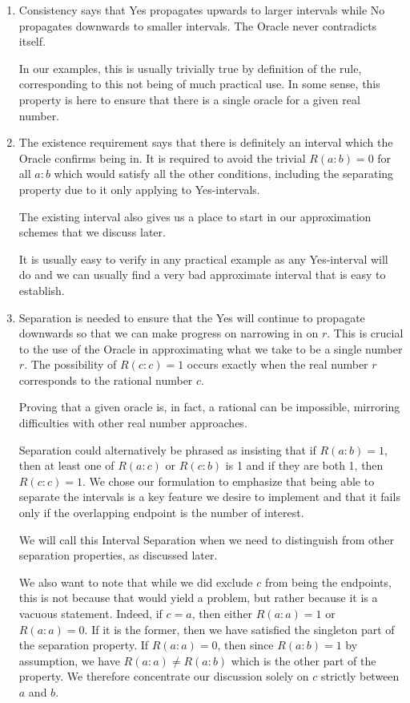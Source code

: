 \documentclass[12pt]{article}
\begin{document}
\begin{enumerate}

    \item Consistency says that Yes propagates upwards to larger intervals while No propagates downwards to smaller intervals. The Oracle never contradicts itself. 
    
    In our examples, this is usually trivially true by definition of the rule, corresponding to this not being of much practical use. In some sense, this property is here to ensure that there is a single oracle for a given real number.  

    \item The existence requirement says that there is definitely an interval which the Oracle confirms being in. It is required to avoid the trivial $R(a:b) = 0$ for all $a:b$ which would satisfy all the other conditions, including the separating property due to it only applying to Yes-intervals. 
    
    The existing interval also gives us a place to start in our approximation schemes that we discuss later. 
    
    It is usually easy to verify in any practical example as any Yes-interval will do and we can usually find a very bad approximate interval that is easy to establish.  

    \item Separation is needed to ensure that the Yes will continue to propagate downwards so that we can make progress on narrowing in on $r$. This is crucial to the use of the Oracle in approximating what we take to be a single number $r$. The possibility of $R(c:c) = 1$ occurs exactly when the real number $r$ corresponds to the rational number $c$. 
    
    Proving that a given oracle is, in fact, a rational can be impossible, mirroring difficulties with other real number approaches. 

    Separation could alternatively be phrased as insisting that if $R(a:b) = 1$, then at least one of $R(a:c)$ or $R(c:b)$ is 1 and if they are both 1, then $R(c:c) = 1$. We chose our formulation to emphasize that being able to separate the intervals is a key feature we desire to implement and that it fails only if the overlapping endpoint is the number of interest. 

    We will call this Interval Separation when we need to distinguish from other separation properties, as discussed later. 

    We also want to note that while we did exclude $c$ from being the endpoints, this is not because that would yield a problem, but rather because it is a vacuous statement. Indeed, if $c=a$, then either $R(a:a)=1$ or $R(a:a)=0$. If it is the former, then we have satisfied the singleton part of the separation property. If $R(a:a)=0$, then since $R(a:b)=1$ by assumption, we have $R(a:a) \neq R(a:b)$ which is the other part of the property. We therefore concentrate our discussion solely on $c$ strictly between $a$ and $b$.
    

\end{enumerate}
\end{document}
